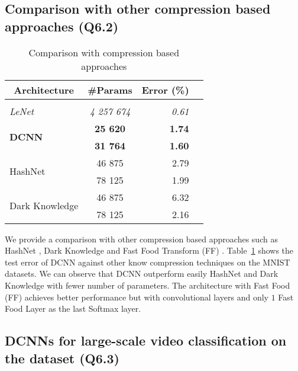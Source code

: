 \subsection{Comparison with other compression based approaches (Q6.2)}


\begin{table}
  \centering
    \caption{Comparison with compression based approaches}
    \begin{tabular}{lcrc}
    \toprule
    \multicolumn{1}{c}{\textbf{Architecture}} & \multicolumn{1}{c}{\textbf{\#Params}} & \textbf{Error (\%)} \\
    \hline \\
    \textit{LeNet \cite{Lecun98gradient-basedlearning}} & \textit{4 257 674} & \textit{0.61} \\
    \multirow{2}[0]{*}{\textbf{DCNN}} & \textbf{25 620} & \textbf{1.74} \\
          & \textbf{31 764} & \textbf{1.60} \\
    \multirow{2}[0]{*}{HashNet \cite{Chen_Hashing_Trick}} & 46 875 & 2.79 \\
          &  78 125 & 1.99 \\
    \multirow{2}[0]{*}{Dark Knowledge \cite{44873}} & 46 875 & 6.32 \\
          &  78 125 & 2.16 \\
    \bottomrule
    \end{tabular}%
  \label{tab:mnist}%
\end{table}%


We provide a comparison with other compression based approaches such as HashNet \cite{Chen_Hashing_Trick}, Dark Knowledge \cite{44873} and Fast Food Transform (FF) \cite{7410530}. 
Table~\ref{tab:mnist} shows the test error of DCNN against other know compression techniques on the MNIST datasets. We can observe that DCNN outperform easily HashNet \cite{Chen_Hashing_Trick} and Dark Knowledge \cite{44873} with fewer number of parameters. The architecture with Fast Food (FF) \cite{7410530} achieves better performance but with convolutional layers and only $1$ Fast Food Layer as the last Softmax layer. 


\subsection{DCNNs for large-scale video classification on the \yt dataset (Q6.3)}


